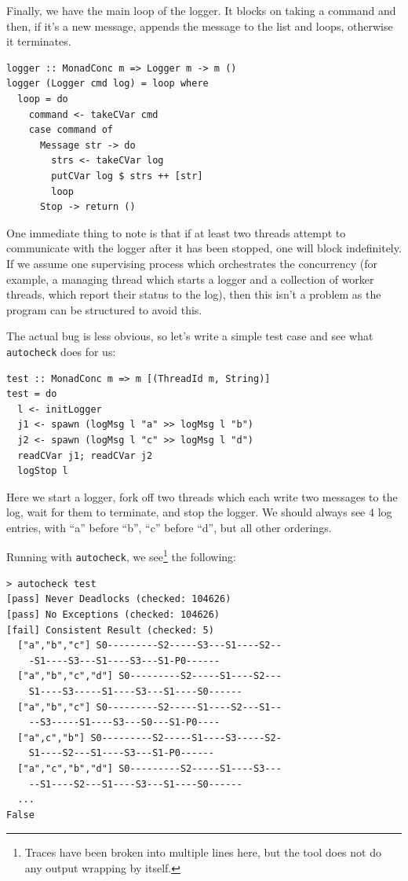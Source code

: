 Finally, we have the main loop of the logger. It blocks on taking a
command and then, if it's a new message, appends the message to the
list and loops, otherwise it terminates.

\begin{verbatim}
logger :: MonadConc m => Logger m -> m ()
logger (Logger cmd log) = loop where
  loop = do
    command <- takeCVar cmd
    case command of
      Message str -> do
        strs <- takeCVar log
        putCVar log $ strs ++ [str]
        loop
      Stop -> return ()
\end{verbatim}

One immediate thing to note is that if at least two threads attempt to
communicate with the logger after it has been stopped, one will block
indefinitely. If we assume one supervising process which orchestrates
the concurrency (for example, a managing thread which starts a logger
and a collection of worker threads, which report their status to the
log), then this isn't a problem as the program can be structured to
avoid this.

The actual bug is less obvious, so let's write a simple test case and
see what \texttt{autocheck} does for us:

\begin{verbatim}
test :: MonadConc m => m [(ThreadId m, String)]
test = do
  l <- initLogger
  j1 <- spawn (logMsg l "a" >> logMsg l "b")
  j2 <- spawn (logMsg l "c" >> logMsg l "d")
  readCVar j1; readCVar j2
  logStop l
\end{verbatim}

Here we start a logger, fork off two threads which each write two
messages to the log, wait for them to terminate, and stop the
logger. We should always see 4 log entries, with ``a'' before ``b'',
``c'' before ``d'', but all other orderings.

Running with \texttt{autocheck}, we see\footnote{Traces have been
  broken into multiple lines here, but the tool does not do any output
  wrapping by itself.} the following:

\begin{verbatim}
> autocheck test
[pass] Never Deadlocks (checked: 104626)
[pass] No Exceptions (checked: 104626)
[fail] Consistent Result (checked: 5)
  ["a","b","c"] S0---------S2-----S3---S1----S2--
    -S1----S3---S1----S3---S1-P0------
  ["a","b","c","d"] S0---------S2-----S1----S2---
    S1----S3-----S1----S3---S1----S0------
  ["a","b","c"] S0---------S2-----S1----S2---S1--
    --S3-----S1----S3---S0---S1-P0----
  ["a",c","b"] S0---------S2-----S1----S3-----S2-
    S1----S2---S1----S3---S1-P0------
  ["a","c","b","d"] S0---------S2-----S1----S3---
    --S1----S2---S1----S3---S1----S0------
  ...
False
\end{verbatim}

